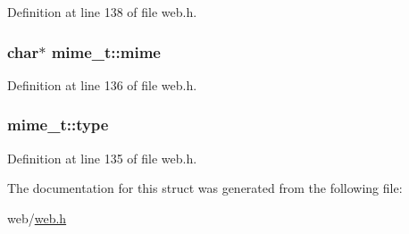 Definition at line 138 of file web.\+h.

\subsubsection[{\texorpdfstring{mime}{mime}}]{\setlength{\rightskip}{0pt plus 5cm}char$\ast$ mime\+\_\+t\+::mime}\hypertarget{structmime__t_ad796d16eaee60d7435bff66b2e9b8a8d}{}\label{structmime__t_ad796d16eaee60d7435bff66b2e9b8a8d}


Definition at line 136 of file web.\+h.

\subsubsection[{\texorpdfstring{type}{type}}]{ mime\+\_\+t\+::type}\hypertarget{structmime__t_ae69826dcfd475d65fa0fe8a1574bb3af}{}\label{structmime__t_ae69826dcfd475d65fa0fe8a1574bb3af}


Definition at line 135 of file web.\+h.



The documentation for this struct was generated from the following file\+:\begin{DoxyCompactItemize}
\item 
web/\hyperlink{web_8h}{web.\+h}\end{DoxyCompactItemize}
